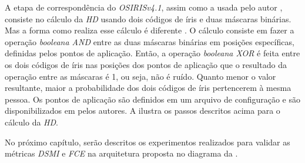 
\par A etapa de correspondência do \textit{OSIRISv4.1}, assim como a usada pelo autor \cite{daugman2004}, consiste no cálculo da \textit{\acrshort{HD}} usando dois códigos de íris e duas máscaras binárias. Mas a forma como realiza esse cálculo é diferente \cite{osirisv41_doc}. O cálculo consiste em fazer a operação \textit{booleana AND} entre as duas máscaras binárias em posições específicas, definidas pelos pontos de aplicação. Então, a operação \textit{booleana XOR} é feita entre os dois códigos de íris nas posições dos pontos de aplicação que o resultado da operação entre as máscaras é 1, ou seja, não é ruído. Quanto menor o valor resultante, maior a probabilidade dos dois códigos de íris pertencerem à mesma pessoa. Os pontos de aplicação são definidos em um arquivo de configuração e são disponibilizados em \cite{osirisv41} pelos autores. A  ilustra os passos descritos acima para o cálculo da \textit{\acrshort{HD}}.

\par No próximo capítulo, serão descritos os experimentos realizados para validar as métricas \textit{\acrshort{DSMI}} e \textit{\acrshort{FCE}} na arquitetura proposta no diagrama da .

